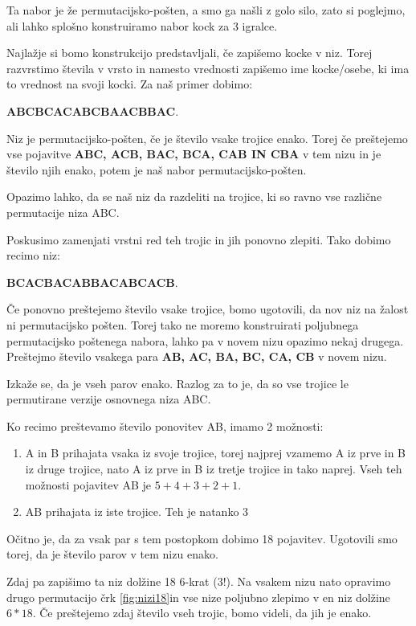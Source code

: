 \documentclass[a4paper, 12pt]{article}
\begin{document}
Ta nabor je že permutacijsko-pošten, a smo ga našli z golo silo, zato si poglejmo, ali lahko splošno konstruiramo nabor kock za 3 igralce.

Najlažje si bomo konstrukcijo predstavljali, če zapišemo kocke v niz. Torej razvrstimo števila v vrsto in namesto vrednosti zapišemo ime kocke/osebe, ki ima to vrednost na svoji kocki. Za naš primer dobimo: \begin{center}
\textbf{ABCBCACABCBAACBBAC}.
\end{center}

Niz je permutacijsko-pošten, če je število vsake trojice enako. Torej če preštejemo vse pojavitve \textbf{ABC, ACB, BAC, BCA, CAB IN CBA} v tem nizu in je število njih enako, potem je naš nabor permutacijsko-pošten.

Opazimo lahko, da se naš niz da razdeliti na trojice, ki so ravno vse različne permutacije niza ABC.

Poskusimo zamenjati vrstni red teh trojic in jih ponovno zlepiti. Tako dobimo recimo niz: \begin{center}
\textbf{BCACBACABBACABCACB}.
\end{center}
Če ponovno preštejemo število vsake trojice, bomo ugotovili, da nov niz na žalost ni permutacijsko pošten. Torej tako ne moremo konstruirati poljubnega permutacijsko poštenega nabora, lahko pa v novem nizu opazimo nekaj drugega. Preštejmo število vsakega para \textbf{AB, AC, BA, BC, CA, CB} v novem nizu.

Izkaže se, da je vseh parov enako. Razlog za to je, da so vse trojice le permutirane verzije osnovnega niza ABC.

Ko recimo preštevamo število ponovitev AB, imamo 2 možnosti:
\begin{enumerate}
  \item A in B prihajata vsaka iz svoje trojice, torej najprej vzamemo A iz prve in B iz druge trojice, nato A iz prve in B iz tretje trojice in tako naprej. Vseh teh možnosti pojavitev AB je $5 + 4 + 3 + 2 + 1$.
  \item AB prihajata iz iste trojice. Teh je natanko 3
\end{enumerate}
Očitno je, da za vsak par s tem postopkom dobimo 18 pojavitev. Ugotovili smo torej, da je število parov v tem nizu enako.

Zdaj pa zapišimo ta niz dolžine 18 6-krat ($3!$). Na vsakem nizu nato opravimo drugo permutacijo črk \ref{fig:nizi18}in vse nize poljubno zlepimo v en niz dolžine $6 * 18$. Če preštejemo zdaj število vseh trojic, bomo videli, da jih je enako.\\
\end{document}
